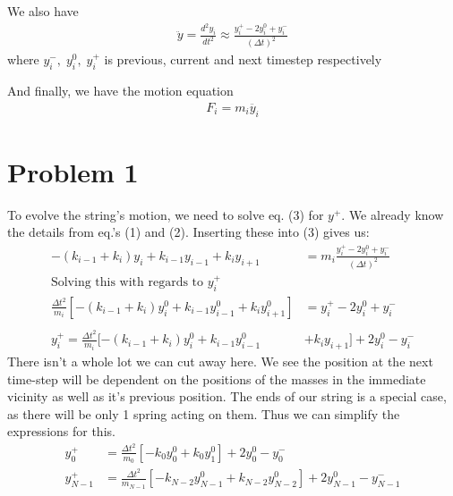 \documentclass[12pt]{article}
\begin{document}
We also have
\begin{equation}
\begin{aligned}
\ddot{y} = \frac{d^2y_i}{dt^2} \approx \frac{y_i^+ - 2y_i^0 + y_i^-}{(\Delta t)^2}
\end{aligned}
\end{equation}
where $y_i^-,\; y_i^0,\; y_i^+$ is previous, current and next timestep respectively

And finally, we have the motion equation 
\begin{equation}
	\begin{aligned}
		F_i = m_i\ddot{y_i}
	\end{aligned}
\end{equation}

\section*{Problem 1}
	To evolve the string's motion, we need to solve eq. (3) for $y^+$. We already know the details from 
eq.'s (1) and (2). Inserting these into (3) gives us:
\begin{equation}
	\begin{aligned}
		-(k_{i-1} + k_i)y_i + k_{i-1}y_{i-1} + k_iy_{i+1} &=
		 m_i \frac{y_i^+ - 2y_i^0 + y_i^-}{(\Delta t)^2} \\
		\text{Solving this with regards to $y_i^+$} \\
		\frac{\Delta t^2}{m_i}[ -(k_{i-1} + k_i)y_i^0 + k_{i-1}y_{i-1}^0 + k_iy_{i+1}^0 ] &= 
		y_i^+ - 2y_i^0 + y_i^- \\ \\
		y_i^+ = \frac{\Delta t^2}{m_i}[ -(k_{i-1} + k_i)y_i^0 + k_{i-1}y_{i-1}^0& + k_iy_{i+1} ]
				+ 2y_i^0 - y_i^-
	\end{aligned}
\end{equation}
There isn't a whole lot we can cut away here. We see the position at the next time-step will be dependent on the positions of the masses in the immediate vicinity as well as it's previous position. 
The ends of our string is a special case, as there will be only 1 spring acting on them. Thus we can simplify the expressions for this. 
\begin{equation}
	\begin{aligned}
		y_0^+ &= \frac{\Delta t^2}{m_0} [ -k_0y_0^0 + k_0y_1^0 ] + 2y_0^0 - y_0^- \\
		y_{N-1}^+ &= \frac{\Delta t^2}{m_{N-1}} [ -k_{N-2}y_{N-1}^0 + k_{N-2}y_{N-2}^0 ] 
					+ 2y_{N-1}^0 - y_{N-1}^-
	\end{aligned}
\end{equation}
\end{document}
